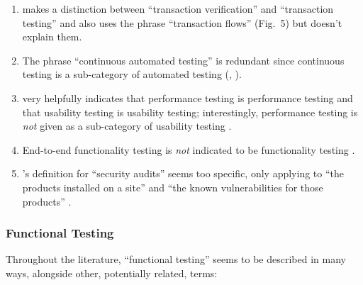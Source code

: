\begin{enumerate}
      \item \citeauthor{Gerrard2000a} makes a distinction between ``transaction
            verification'' and ``transaction testing''
            \citeyearpar[Tab.~2]{Gerrard2000a} and also uses the phrase
            ``transaction flows'' (Fig.~5) but doesn't explain them.
      \item The phrase ``continuous automated testing''  \citep[p.~11]{Gerrard2000a}
            is redundant since continuous testing is a sub-category of automated
            testing (\citealp[p.~35]{IEEE2022}, \citealpISTQB{}).
      \item \citeauthor{Gerrard2000a} very helpfully indicates that performance
            testing is performance testing and that usability testing is
            usability testing; interestingly, performance testing is \emph{not}
            given as a sub-category of usability testing
            \citeyearpar[Tab.~2]{Gerrard2000a}.
      \item End-to-end functionality testing is \emph{not} indicated to be
            functionality testing \citep[Tab.~2]{Gerrard2000a}.
      \item \citeauthor{Gerrard2000b}'s definition for ``security audits''
            seems too specific, only applying to ``the products installed on a
            site'' and ``the known vulnerabilities for those products''
            \citeyearpar[p.~28]{Gerrard2000b}.
\end{enumerate}


\subsubsection{Functional Testing}

Throughout the literature, ``functional testing'' seems to be described in many
ways, alongside other, potentially related, terms:

